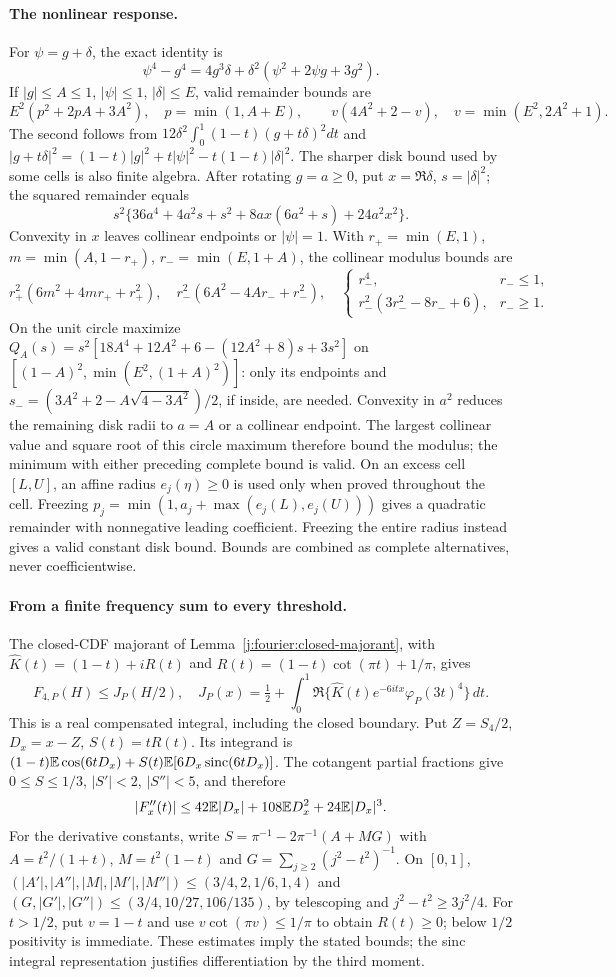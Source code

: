 \paragraph{The nonlinear response.}
For $\psi=g+\delta$, the exact identity is
\[
 \psi^4-g^4=4g^3\delta+\delta^2(\psi^2+2\psi g+3g^2).
\]
If $|g|\le A\le1$, $|\psi|\le1$, $|\delta|\le E$, valid
remainder bounds are
\[
 E^2(p^2+2pA+3A^2),\quad p=\min(1,A+E),\qquad
 v(4A^2+2-v),\quad v=\min(E^2,2A^2+1).
\]
The second follows from
$12\delta^2\int_0^1(1-t)(g+t\delta)^2dt$ and
$|g+t\delta|^2=(1-t)|g|^2+t|\psi|^2-t(1-t)|\delta|^2$.
The sharper disk bound used by some cells is also finite algebra.
After rotating $g=a\ge0$, put $x=\Re\delta$, $s=|\delta|^2$;
the squared remainder equals
\[
 s^2\{36a^4+4a^2s+s^2+8ax(6a^2+s)+24a^2x^2\}.
\]
Convexity in $x$ leaves collinear endpoints or $|\psi|=1$.
With $r_+=\min(E,1)$, $m=\min(A,1-r_+)$, $r_-=\min(E,1+A)$,
the collinear modulus bounds are
\[
 r_+^2(6m^2+4mr_++r_+^2),\quad r_-^2(6A^2-4Ar_-+r_-^2),\quad
 \begin{cases}r_-^4,&r_-\le1,\\r_-^2(3r_-^2-8r_-+6),&r_-\ge1.
 \end{cases}
\]
On the unit circle maximize
$Q_A(s)=s^2[18A^4+12A^2+6-(12A^2+8)s+3s^2]$
on $[(1-A)^2,\min(E^2,(1+A)^2)]$: only its endpoints and
$s_-=(3A^2+2-A\sqrt{4-3A^2})/2$, if inside, are needed.
Convexity in $a^2$ reduces the remaining disk radii to $a=A$ or a
collinear endpoint. The largest collinear value and square root of
this circle maximum therefore bound the modulus; the minimum with
either preceding complete bound is valid.
On an excess cell $[L,U]$, an affine radius $e_j(\eta)\ge0$ is
used only when proved throughout the cell. Freezing
$p_j=\min(1,a_j+\max(e_j(L),e_j(U)))$ gives a quadratic remainder
with nonnegative leading coefficient. Freezing the entire radius
instead gives a valid constant disk bound. Bounds are combined as
complete alternatives, never coefficientwise.

\paragraph{From a finite frequency sum to every threshold.}
The closed-CDF majorant of Lemma~\ref{j:fourier:closed-majorant}, with
$\widehat K(t)=(1-t)+iR(t)$ and
$R(t)=(1-t)\cot(\pi t)+1/\pi$, gives
\[
 F_{4,P}(H)\le J_P(H/2),\quad
 J_P(x)=\tfrac12+\int_0^1
 \Re\{\widehat K(t)e^{-6itx}\varphi_P(3t)^4\}\,dt.
\]
This is a real compensated integral, including the closed boundary.
Put $Z=S_4/2$, $D_x=x-Z$, $S(t)=tR(t)$. Its integrand is
$(1-t)\mathbb E\cos(6tD_x)+S(t)\mathbb E[6D_x\operatorname{sinc}(6tD_x)]$.
The cotangent partial fractions give $0\le S\le1/3$,
$|S'|<2$, $|S''|<5$, and therefore
\[
 |F_x''(t)|\le42\mathbb E|D_x|+108\mathbb E D_x^2+24\mathbb E|D_x|^3.
\]
For the derivative constants, write
$S=\pi^{-1}-2\pi^{-1}(A+MG)$ with
$A=t^2/(1+t)$, $M=t^2(1-t)$ and
$G=\sum_{j\ge2}(j^2-t^2)^{-1}$.
On $[0,1]$, $(|A'|,|A''|,|M|,|M'|,|M''|)\le(3/4,2,1/6,1,4)$
and $(G,|G'|,|G''|)\le(3/4,10/27,106/135)$, by telescoping and
$j^2-t^2\ge3j^2/4$. For $t>1/2$, put $v=1-t$ and use $v\cot(\pi v)\le1/\pi$
to obtain $R(t)\ge0$; below $1/2$ positivity is immediate.
These estimates imply the stated bounds; the sinc
integral representation justifies differentiation by the third moment.

